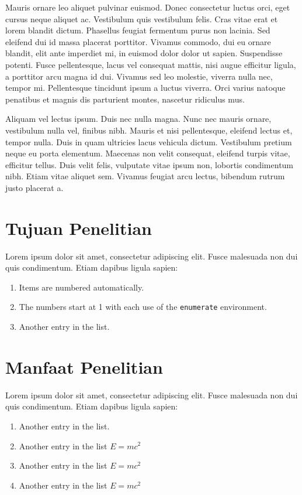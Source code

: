     Mauris ornare leo aliquet pulvinar euismod. Donec consectetur luctus orci, eget cursus neque aliquet ac. Vestibulum quis vestibulum felis. Cras vitae erat et lorem blandit dictum. Phasellus feugiat fermentum purus non lacinia. Sed eleifend dui id massa placerat porttitor. Vivamus commodo, dui eu ornare blandit, elit ante imperdiet mi, in euismod dolor dolor ut sapien. Suspendisse potenti. Fusce pellentesque, lacus vel consequat mattis, nisi augue efficitur ligula, a porttitor arcu magna id dui. Vivamus sed leo molestie, viverra nulla nec, tempor mi. Pellentesque tincidunt ipsum a luctus viverra. Orci varius natoque penatibus et magnis dis parturient montes, nascetur ridiculus mus.\par

    Aliquam vel lectus ipsum. Duis nec nulla magna. Nunc nec mauris ornare, vestibulum nulla vel, finibus nibh. Mauris et nisi pellentesque, eleifend lectus et, tempor nulla. Duis in quam ultricies lacus vehicula dictum. Vestibulum pretium neque eu porta elementum. Maecenas non velit consequat, eleifend turpis vitae, efficitur tellus. Duis velit felis, vulputate vitae ipsum non, lobortis condimentum nibh. Etiam vitae aliquet sem. Vivamus feugiat arcu lectus, bibendum rutrum justo placerat a.\\

\section{Tujuan Penelitian}
    Lorem ipsum dolor sit amet, consectetur adipiscing elit. Fusce malesuada non dui quis condimentum. Etiam dapibus ligula sapien:
    \begin{enumerate}
        \item Items are numbered automatically.
        \item The numbers start at 1 with each use of the \texttt{enumerate} environment.
        \item Another entry in the list.\\
    \end{enumerate} 

\section{Manfaat Penelitian}
    Lorem ipsum dolor sit amet, consectetur adipiscing elit. Fusce malesuada non dui quis condimentum. Etiam dapibus ligula sapien:
    \begin{enumerate}
        \item Another entry in the list.
        \item Another entry in the list \(E = mc^2 \)
        \item Another entry in the list \(E = mc^2 \)
        \item Another entry in the list \(E = mc^2 \) 
    \end{enumerate} 
